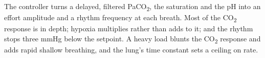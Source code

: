 \begin{summarybox}
The controller turns a delayed, filtered PaCO\textsubscript{2}, the saturation and the pH into an effort amplitude and a rhythm frequency at each breath. Most of the CO\textsubscript{2} response is in depth; hypoxia multiplies rather than adds to it; and the rhythm stops three mmHg below the setpoint. A heavy load blunts the CO\textsubscript{2} response and adds rapid shallow breathing, and the lung's time constant sets a ceiling on rate.
\end{summarybox}
